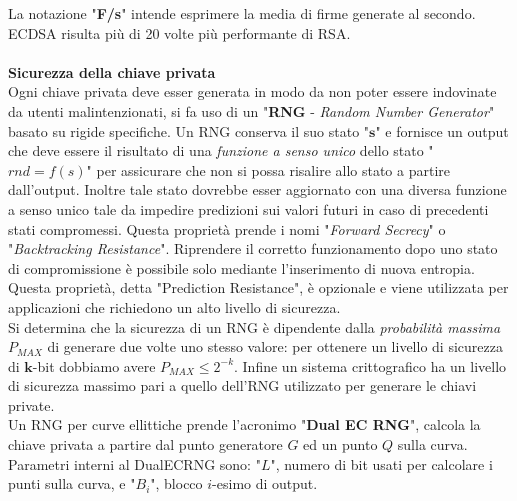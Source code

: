 \documentclass[a4paper,12pt]{tesiinfo}
\begin{document}
La notazione "\textbf{F/s}" intende esprimere la media di firme generate al secondo.\\
ECDSA risulta pi\`u di 20 volte pi\`u performante di RSA.
\\
\\
\textbf{Sicurezza della chiave privata}
\\
Ogni chiave privata deve esser generata in modo da non poter essere indovinate da utenti malintenzionati, si fa uso di un "\textbf{RNG} - \textit{Random Number Generator}" basato su rigide specifiche. Un RNG conserva il suo stato "$\mathbold{s}$" e fornisce un output che deve essere il risultato di una \textit{funzione a senso unico} dello stato "${rnd = f(s)}$" per assicurare che non si possa risalire allo stato a partire dall'output. Inoltre tale stato dovrebbe esser aggiornato con una diversa funzione a senso unico tale da impedire predizioni sui valori futuri in caso di precedenti stati compromessi. Questa propriet\`a prende i nomi "\textit{Forward Secrecy}" o "\textit{Backtracking Resistance}". Riprendere il corretto funzionamento dopo uno stato di compromissione \`e possibile solo mediante l'inserimento di nuova entropia. Questa propriet\`a, detta "Prediction Resistance", \`e opzionale e viene utilizzata per applicazioni che richiedono un alto livello di sicurezza.
\\
Si determina che la sicurezza di un RNG \`e dipendente dalla \textit{probabilit\`a massima} ${P_{MAX}}$ di generare due volte uno stesso valore: per ottenere un livello di sicurezza di $\mathbold{k}$-bit dobbiamo avere $P_{MAX} \leq 2^{-k}$.
Infine un sistema crittografico ha un livello di sicurezza massimo pari a quello dell'RNG utilizzato per generare le chiavi private.
\\
Un RNG per curve ellittiche prende l'acronimo "\textbf{Dual EC RNG}", calcola la chiave privata a partire dal punto generatore $G$ ed un punto $Q$ sulla curva. Parametri interni al DualECRNG sono: "$L$", numero di bit usati per calcolare i punti sulla curva, e "$B_i$", blocco $i$-esimo di output.
\\
\end{document}
